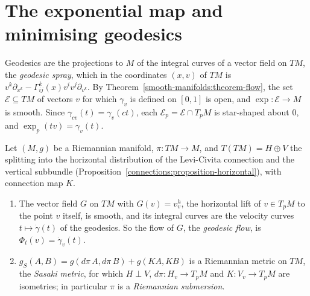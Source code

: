 \section{The exponential map and minimising geodesics}\label{riemannian-geometry:section-exponential}

Geodesics are the projections to $M$ of the integral curves of a vector field on $TM$, the \emph{geodesic spray}, which in the coordinates $(x, v)$ of $TM$ is $v^k\partial_{x^k} - \Gamma^k_{ij}(x)v^iv^j\partial_{v^k}$. By
Theorem~\ref{smooth-manifolds:theorem-flow}, the set $\mathcal{E} \subseteq TM$ of vectors $v$ for which $\gamma_v$ is defined on $[0, 1]$ is open, and $\exp \colon \mathcal{E} \to M$ is smooth. Since $\gamma_{cv}(t) = \gamma_v(ct)$, each
$\mathcal{E}_p = \mathcal{E} \cap T_pM$ is star-shaped about $0$, and $\exp_p(tv) = \gamma_v(t)$.

\begin{proposition}\label{riemannian-geometry:proposition-geodesic-spray}
Let $(M, g)$ be a Riemannian manifold, $\pi \colon TM \to M$, and $T(TM) = H \oplus V$ the splitting into the horizontal distribution of the Levi-Civita connection and the vertical subbundle
(Proposition~\ref{connections:proposition-horizontal}), with connection map $K$.
\begin{enumerate}
\item The vector field $G$ on $TM$ with $G(v) = v^h_v$, the horizontal lift of $v \in T_pM$ to the point $v$ itself, is smooth, and its integral curves are the velocity curves $t \mapsto \dot\gamma(t)$
of the geodesics. So the flow of $G$, the \emph{geodesic flow}, is $\Phi_t(v) = \dot\gamma_v(t)$.
\item $g_S(A, B) = g(d\pi\,A, d\pi\,B) + g(KA, KB)$ is a Riemannian metric on $TM$, the \emph{Sasaki metric}, for which $H \perp V$, $d\pi \colon H_v \to T_pM$ and $K \colon V_v \to T_pM$ are isometries; in
particular $\pi$ is a \emph{Riemannian submersion}.
\end{enumerate}
\end{proposition}

